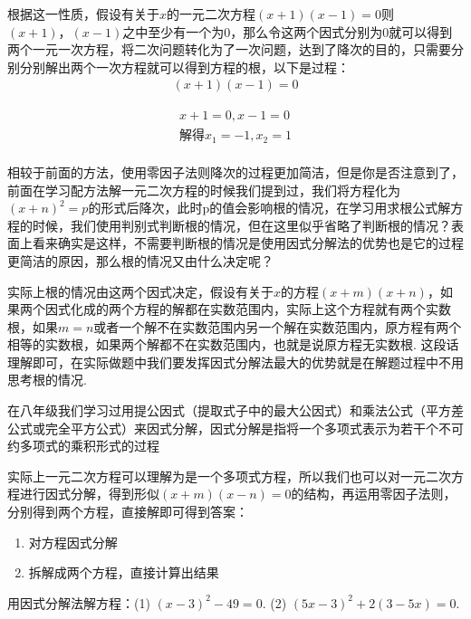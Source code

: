 根据这一性质，假设有关于\(x\)的一元二次方程\((x+1)(x-1)=0\)则\((x+1)，(x-1)\)之中至少有一个为0，那么令这两个因式分别为0就可以得到两个一元一次方程，将二次问题转化为了一次问题，达到了降次的目的，只需要分别分别解出两个一次方程就可以得到方程的根，以下是过程：
\begin{align*}
    (x+1)(x-1)=0
\end{align*}
\begin{solution}
    \begin{align*}
        x+1=0, x-1=0\\
        解得x_1=-1,x_2=1\\
    \end{align*}
\end{solution}
相较于前面的方法，使用零因子法则降次的过程更加简洁，但是你是否注意到了，前面在学习配方法解一元二次方程的时候我们提到过，我们将方程化为\((x+n)^2=p\)的形式后降次，此时p的值会影响根的情况，在学习用求根公式解方程的时候，我们使用判别式判断根的情况，但在这里似乎省略了判断根的情况？表面上看来确实是这样，不需要判断根的情况是使用因式分解法的优势也是它的过程更简洁的原因，那么根的情况又由什么决定呢？
\par
实际上根的情况由这两个因式决定，假设有关于\(x\)的方程\((x+m)(x+n)\)，如果两个因式化成的两个方程的解都在实数范围内，实际上这个方程就有两个实数根，如果\(m=n\)或者一个解不在实数范围内另一个解在实数范围内，原方程有两个相等的实数根，如果两个解都不在实数范围内，也就是说原方程无实数根. 这段话理解即可，在实际做题中我们要发挥因式分解法最大的优势就是在解题过程中不用思考根的情况.

在八年级我们学习过用提公因式（提取式子中的最大公因式）和乘法公式（平方差公式或完全平方公式）来因式分解，因式分解是指将一个多项式表示为若干个不可约多项式的乘积形式的过程
\par
实际上一元二次方程可以理解为是一个多项式方程，所以我们也可以对一元二次方程进行因式分解，得到形似\((x+m)(x-n)=0\)的结构，再运用零因子法则，分别得到两个方程，直接解即可得到答案：

\begin{enumerate}
    \item 对方程因式分解
    \item 拆解成两个方程，直接计算出结果
\end{enumerate}



\begin{example}
    用因式分解法解方程：(1) \((x-3)^2-49=0\). (2) \((5x-3)^2+2(3-5x)=0\).
\end{example}

